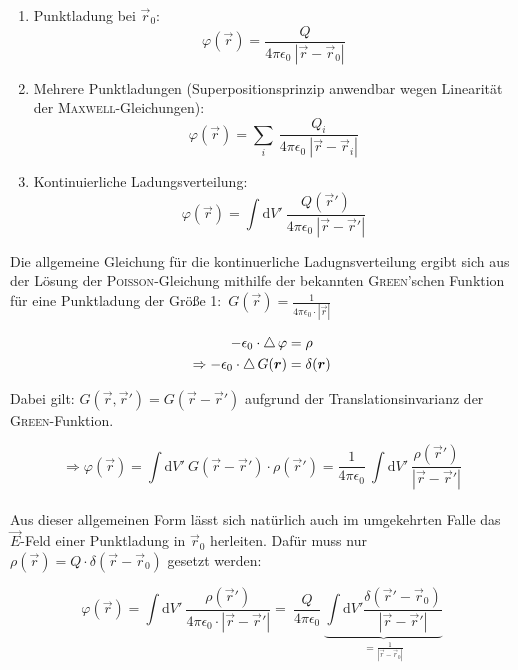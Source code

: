 \begin{enumerate}
\item Punktladung bei $\vec{r}_0$:
\begin{equation*}
\varphi(\vec{r}) = \frac{Q}{4\pi\epsilon_0 \ |\vec{r}-\vec{r}_0|}
\end{equation*}


\item Mehrere Punktladungen (Superpositionsprinzip anwendbar wegen Linearität der \textsc{Maxwell}-Gleichungen):
\begin{equation*}
\varphi(\vec{r}) = \sum\limits_i \ \frac{Q_i}{4\pi\epsilon_0 \ |\vec{r}-\vec{r}_i|}
\end{equation*}

\item Kontinuierliche Ladungsverteilung:
\begin{equation*}
\varphi(\vec{r}) = \int\mathrm{d}V' \ \frac{Q(\vec{r}')}{4\pi\epsilon_0 \ |\vec{r}-\vec{r}'|}
\end{equation*}
\end{enumerate}

Die allgemeine Gleichung für die kontinuerliche Ladugnsverteilung ergibt sich aus der Lösung der \textsc{Poisson}-Gleichung mithilfe der bekannten \textsc{Green}'schen Funktion für eine Punktladung der Größe 1:\ $G(\vec{r}) = \frac{1}{4\pi\epsilon_0 \cdot |\vec{r}|}$\

\begin{align*}
-\epsilon_0 \cdot \mathop{{}\bigtriangleup}\nolimits\varphi &= \rho\\
\Rightarrow -\epsilon_0 \cdot \mathop{{}\bigtriangleup}\nolimits G(\bm{r}) &= \delta(\bm{r})\\
\end{align*}

Dabei gilt: $G(\vec{r},\vec{r}') = G(\vec{r}-\vec{r}')$ aufgrund der Translationsinvarianz der \textsc{Green}-Funktion.

\begin{equation*}
\Rightarrow \varphi(\vec{r}) = \int\mathrm{d}V' \ G(\vec{r}-\vec{r}')\cdot\rho(\vec{r}') = \frac{1}{4\pi\epsilon_0} \ \int\mathrm{d}V' \ \frac{\rho(\vec{r}')}{|\vec{r}-\vec{r}'|}
\end{equation*}
\ \\

Aus dieser allgemeinen Form lässt sich natürlich auch im umgekehrten Falle das $\vec{E}$-Feld einer Punktladung in $\vec{r}_0$ herleiten. Dafür muss nur $\rho(\vec{r}) = Q\cdot\delta(\vec{r}-\vec{r}_0)$ gesetzt werden:

\begin{equation*}
\varphi(\vec{r}) = \int\mathrm{d}V' \ \frac{\rho(\vec{r}')}{4\pi\epsilon_0 \cdot |\vec{r}-\vec{r}'|} = \ \frac{Q}{4\pi\epsilon_0} \ \underbrace{\int\mathrm{d}V'\frac{\delta(\vec{r}'-\vec{r}_0)}{|\vec{r}-\vec{r}'|}}_{=\frac{1}{|\vec{r}-\vec{r}_0|}}
\end{equation*}

